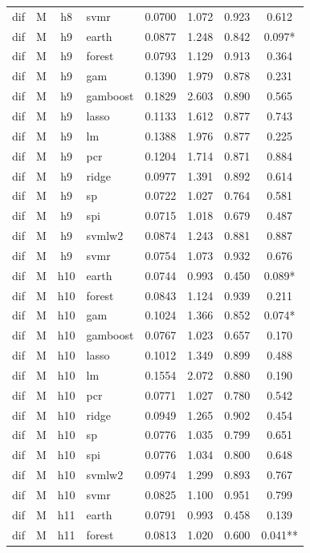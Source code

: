\begin{ThreePartTable}
\begin{longtable}[t]{llclcccc}
dif & M & h8 & svmr & 0.0700 & 1.072 & 0.923 & 0.612\\
\addlinespace
dif & M & h9 & earth & 0.0877 & 1.248 & 0.842 & 0.097*\\
dif & M & h9 & forest & 0.0793 & 1.129 & 0.913 & 0.364\\
dif & M & h9 & gam & 0.1390 & 1.979 & 0.878 & 0.231\\
dif & M & h9 & gamboost & 0.1829 & 2.603 & 0.890 & 0.565\\
dif & M & h9 & lasso & 0.1133 & 1.612 & 0.877 & 0.743\\
dif & M & h9 & lm & 0.1388 & 1.976 & 0.877 & 0.225\\
dif & M & h9 & pcr & 0.1204 & 1.714 & 0.871 & 0.884\\
dif & M & h9 & ridge & 0.0977 & 1.391 & 0.892 & 0.614\\
dif & M & h9 & sp & 0.0722 & 1.027 & 0.764 & 0.581\\
dif & M & h9 & spi & 0.0715 & 1.018 & 0.679 & 0.487\\
dif & M & h9 & svmlw2 & 0.0874 & 1.243 & 0.881 & 0.887\\
dif & M & h9 & svmr & 0.0754 & 1.073 & 0.932 & 0.676\\
\addlinespace
dif & M & h10 & earth & 0.0744 & 0.993 & 0.450 & 0.089*\\
dif & M & h10 & forest & 0.0843 & 1.124 & 0.939 & 0.211\\
dif & M & h10 & gam & 0.1024 & 1.366 & 0.852 & 0.074*\\
dif & M & h10 & gamboost & 0.0767 & 1.023 & 0.657 & 0.170\\
dif & M & h10 & lasso & 0.1012 & 1.349 & 0.899 & 0.488\\
dif & M & h10 & lm & 0.1554 & 2.072 & 0.880 & 0.190\\
dif & M & h10 & pcr & 0.0771 & 1.027 & 0.780 & 0.542\\
dif & M & h10 & ridge & 0.0949 & 1.265 & 0.902 & 0.454\\
dif & M & h10 & sp & 0.0776 & 1.035 & 0.799 & 0.651\\
dif & M & h10 & spi & 0.0776 & 1.034 & 0.800 & 0.648\\
dif & M & h10 & svmlw2 & 0.0974 & 1.299 & 0.893 & 0.767\\
dif & M & h10 & svmr & 0.0825 & 1.100 & 0.951 & 0.799\\
\addlinespace
dif & M & h11 & earth & 0.0791 & 0.993 & 0.458 & 0.139\\
dif & M & h11 & forest & 0.0813 & 1.020 & 0.600 & 0.041**\\

\end{longtable}
\end{ThreePartTable}
